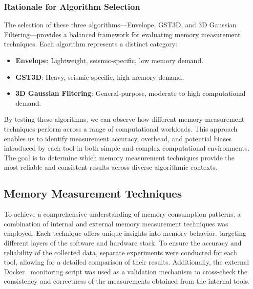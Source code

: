 
\subsubsection{Rationale for Algorithm Selection}

The selection of these three algorithms—Envelope, \ac{GST3D}, and 3D Gaussian Filtering—provides a balanced framework for evaluating memory measurement techniques.
Each algorithm represents a distinct category:

\begin{itemize}
    \item \textbf{Envelope}: Lightweight, seismic-specific, low memory demand.
    \item \textbf{\ac{GST3D}}: Heavy, seismic-specific, high memory demand.
    \item \textbf{3D Gaussian Filtering}: General-purpose, moderate to high computational demand.
\end{itemize}

By testing these algorithms, we can observe how different memory measurement techniques perform across a range of computational workloads.
This approach enables us to identify measurement accuracy, overhead, and potential biases introduced by each tool in both simple and complex computational environments.
The goal is to determine which memory measurement techniques provide the most reliable and consistent results across diverse algorithmic contexts.

\subsection{Memory Measurement Techniques}
\label{subsec:mmc-memory-measurement-techniques}

To achieve a comprehensive understanding of memory consumption patterns, a combination of internal and external memory measurement techniques was employed.
Each technique offers unique insights into memory behavior, targeting different layers of the software and hardware stack.
To ensure the accuracy and reliability of the collected data, separate experiments were conducted for each tool, allowing for a detailed comparison of their results.
Additionally, the external Docker~\cite{docker} monitoring script was used as a validation mechanism to cross-check the consistency and correctness of the measurements obtained from the internal tools.

